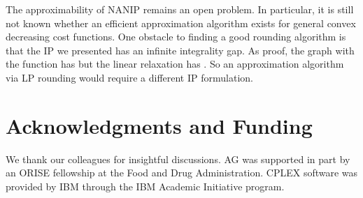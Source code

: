 \documentclass[english]{llncs}
\begin{document}
The approximability of NANIP remains an open problem. In particular, it is
still not known whether an efficient  approximation algorithm exists for
general convex decreasing cost functions. One obstacle to finding a good
rounding algorithm is that the IP we presented has an infinite integrality gap.
As proof, the graph  with the function  has
 but the linear relaxation has . So an approximation algorithm via LP rounding would require a different IP
formulation.

\section*{Acknowledgments and Funding}
We thank our colleagues for insightful discussions.
AG was supported in part by an ORISE fellowship at the Food and Drug Administration.
CPLEX software was provided by IBM through the IBM Academic Initiative program.



\end{document}
